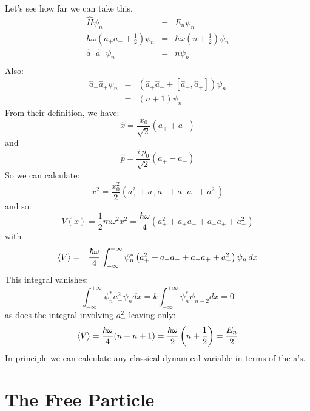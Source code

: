 \documentclass[12pt]{book}
\begin{document}
Let's see how far we can take this.
\begin{eqnarray*}
\hat{H} \psi_n &=& E_n \psi_n \\
\hbar\omega \left( a_+ a_- + \frac{1}{2} \right) \psi_n &=& \hbar \omega \left(n + \frac{1}{2} \right) \psi_n \\
\hat{a}_+ \hat{a}_- \psi_n &=& n \psi_n \\
\end{eqnarray*}
Also:
\begin{eqnarray*}
\hat{a}_- \hat{a}_+ \psi_n &=& \left(\hat{a}_+\hat{a}_- + [\hat{a}_-,\hat{a}_+]\right) \psi_n \\
&=& (n+1) \psi_n
\end{eqnarray*}
From their definition, we have:
\begin{equation*}
\hat{x} = \frac{x_0}{\sqrt{2}} \left( a_+ + a_-\right)
\end{equation*}
and 
\begin{equation*}
\hat{p} = \frac{i\,p_0}{\sqrt{2}} \left( a_+ - a_-\right)
\end{equation*}
So we can calculate:
\begin{equation*}
x^2 = \frac{x_0^2}{2} \left( a_+^2 + a_+a_- + a_-a_+ + a_-^2 \right)
\end{equation*}
and so:
\begin{equation*}
V(x) = \frac{1}{2}m \omega^2 x^2= \frac{\hbar \omega}{4} \left( a_+^2 + a_+a_- + a_-a_+ + a_-^2 \right)
\end{equation*}
with
\begin{eqnarray*}
\braket{V} &=& \frac{\hbar \omega}{4} \int_{-\infty}^{+\infty} \psi_n^* \left( a_+^2 + a_+a_- + a_-a_+ + a_-^2 \right) \psi_n \, dx
\end{eqnarray*}
This integral vanishes:
$$\int_{-\infty}^{+\infty} \psi_n^* a_+^2 \psi_n dx = k \int_{-\infty}^{+\infty} \psi_n^* \psi_{n-2} dx
 = 0 $$
as does the integral involving $a_-^2$ leaving only:
\begin{equation*}
\braket{V} = \frac{\hbar \omega}{4} (n + n + 1) = \frac{\hbar \omega}{2} \left(n + \frac{1}{2}\right) 
= \frac{E_n}{2}
\end{equation*}
In principle we can calculate any classical dynamical variable in terms of the a's.

\section{The Free Particle}
\end{document}

